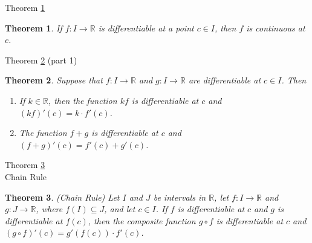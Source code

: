 \documentclass[avery5371,grid]{flashcards}
\newtheorem{theorem}{Theorem}
\newcommand{\bb}[1]{\mathbb{#1}}
\newcommand{\R}{\bb{R}}
\begin{document}
\begin{flashcard}[Theorem]{Theorem \ref{thm80}}
\begin{theorem}
\label{thm80}
If $f: I \to \R$ is differentiable at a point $c \in I$, then $f$ is
continuous at $c$.
\end{theorem}
\end{flashcard}

\begin{flashcard}[Theorem]{Theorem \ref{thm81} (part 1)}
\begin{theorem}
\label{thm81}
Suppose that $f: I \to \R$ and $g: I \to \R$ are differentiable at $c \in I$.  Then
\begin{enumerate} 
\item[(a)]  If $k \in \R$, then the function $kf$ is differentiable at $c$ and $(kf)'(c) = k\cdot f'(c)$.
\item[(b)]  The function $f+g$ is differentiable at $c$ and $(f+g)'(c) = f'(c) + g'(c)$.
\end{enumerate}
\end{theorem}
\end{flashcard}


\begin{flashcard}[Theorem]{Theorem \ref{thm82}\\ Chain Rule}
\begin{theorem}
\label{thm82}
(Chain Rule)  Let $I$ and $J$ be intervals in $\R$, let $f:I \to \R$ and
$g: J \to \R$, where $f(I) \subseteq J$, and let $c \in I$.  If $f$ is
differentiable at $c$ and $g$ is differentiable at $f(c)$, then the
composite function $g \circ f$ is differentiable at $c$ and
$(g\circ f)'(c) = g'(f(c))\cdot f'(c)$.
\end{theorem}
\end{flashcard}
\end{document}
